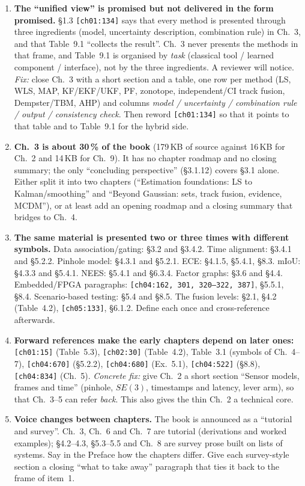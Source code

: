 \documentclass[10pt,a4paper]{article}
\newcommand{\src}[1]{{\footnotesize\texttt{[#1]}}}
\begin{document}
\begin{enumerate}
\item \textbf{The ``unified view'' is promised but not delivered in the form promised.} \S1.3 \src{ch01:134} says that every method is presented through three ingredients (model, uncertainty description, combination rule) in Ch.~3, and that Table~9.1 ``collects the result''. Ch.~3 never presents the methods in that frame, and Table~9.1 is organised by \emph{task} (classical tool / learned component / interface), not by the three ingredients. A reviewer will notice. \emph{Fix:} close Ch.~3 with a short section and a table, one row per method (LS, WLS, MAP, KF/EKF/UKF, PF, zonotope, independent/CI track fusion, Dempster/TBM, AHP) and columns \emph{model / uncertainty / combination rule / output / consistency check}. Then reword \src{ch01:134} so that it points to that table and to Table~9.1 for the hybrid side.
\item \textbf{Ch.~3 is about 30\,\% of the book} (179\,KB of source against 16\,KB for Ch.~2 and 14\,KB for Ch.~9). It has no chapter roadmap and no closing summary; the only ``concluding perspective'' (\S3.1.12) covers \S3.1 alone. Either split it into two chapters (``Estimation foundations: LS to Kalman/smoothing'' and ``Beyond Gaussian: sets, track fusion, evidence, MCDM''), or at least add an opening roadmap and a closing summary that bridges to Ch.~4.
\item \textbf{The same material is presented two or three times with different symbols.} Data association/gating: \S3.2 and \S3.4.2. Time alignment: \S3.4.1 and \S5.2.2. Pinhole model: \S4.3.1 and \S5.2.1. ECE: \S4.1.5, \S5.4.1, \S8.3. mIoU: \S4.3.3 and \S5.4.1. NEES: \S5.4.1 and \S6.3.4. Factor graphs: \S3.6 and \S4.4. Embedded/FPGA paragraphs: \src{ch04:162, 301, 320--322, 387}, \S5.5.1, \S8.4. Scenario-based testing: \S5.4 and \S8.5. The fusion levels: \S2.1, \S4.2 (Table~4.2), \src{ch05:133}, \S6.1.2. Define each once and cross-reference afterwards.
\item \textbf{Forward references make the early chapters depend on later ones:} \src{ch01:15} (Table~5.3), \src{ch02:30} (Table~4.2), Table~3.1 (symbols of Ch.~4--7), \src{ch04:670} (\S5.2.2), \src{ch04:680} (Ex.~5.1), \src{ch04:522} (\S8.8), \src{ch04:834} (Ch.~5). \emph{Concrete fix:} give Ch.~2 a short section ``Sensor models, frames and time'' (pinhole, $SE(3)$, timestamps and latency, lever arm), so that Ch.~3--5 can refer \emph{back}. This also gives the thin Ch.~2 a technical core.
\item \textbf{Voice changes between chapters.} The book is announced as a ``tutorial and survey''. Ch.~3, Ch.~6 and Ch.~7 are tutorial (derivations and worked examples); \S4.2--4.3, \S5.3--5.5 and Ch.~8 are survey prose built on lists of systems. Say in the Preface how the chapters differ. Give each survey-style section a closing ``what to take away'' paragraph that ties it back to the frame of item~1.

\end{enumerate}
\end{document}
